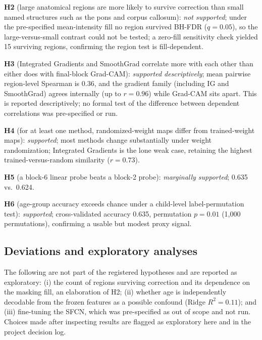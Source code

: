 \documentclass[11pt]{article}
\begin{document}
\textbf{H2} (large anatomical regions are more likely to survive correction than small named structures such as the pons and corpus callosum): \emph{not supported}; under the pre-specified mean-intensity fill no region survived BH-FDR ($q=0.05$), so the large-versus-small contrast could not be tested; a zero-fill sensitivity check yielded 15 surviving regions, confirming the region test is fill-dependent.

\textbf{H3} (Integrated Gradients and SmoothGrad correlate more with each other than either does with final-block Grad-CAM): \emph{supported descriptively}; mean pairwise region-level Spearman is 0.36, and the gradient family (including IG and SmoothGrad) agrees internally (up to $r=0.96$) while Grad-CAM sits apart. This is reported descriptively; no formal test of the difference between dependent correlations was pre-specified or run.

\textbf{H4} (for at least one method, randomized-weight maps differ from trained-weight maps): \emph{supported}; most methods change substantially under weight randomization; Integrated Gradients is the lone weak case, retaining the highest trained-versus-random similarity ($r=0.73$).

\textbf{H5} (a block-6 linear probe beats a block-2 probe): \emph{marginally supported}; 0.635 vs.\ 0.624.

\textbf{H6} (age-group accuracy exceeds chance under a child-level label-permutation test): \emph{supported}; cross-validated accuracy 0.635, permutation $p=0.01$ (1{,}000 permutations), confirming a usable but modest proxy signal.

\subsection{Deviations and exploratory analyses}
The following are not part of the registered hypotheses and are reported as exploratory: (i) the count of regions surviving correction and its dependence on the masking fill, an elaboration of H2; (ii) whether age is independently decodable from the frozen features as a possible confound (Ridge $R^2=0.11$); and (iii) fine-tuning the SFCN, which was pre-specified as out of scope and not run. Choices made after inspecting results are flagged as exploratory here and in the project decision log.
\end{document}
